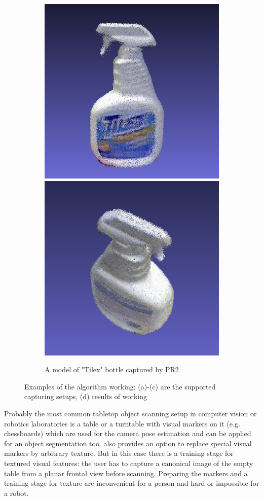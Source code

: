 \documentclass[letterpaper, 10 pt, conference]{ieeeconf}  %
\begin{document}
\begin{figure}[t]
        \begin{subfigure}[b]{\linewidth}
                \centering
                \includegraphics[width=0.49\linewidth]{../tizer/tilexFrontal.png}
                \includegraphics[width=0.49\linewidth]{../tizer/tilexTop.png}
                \caption{A model of "Tilex" bottle captured by PR2}
        \end{subfigure}
        \caption{Examples of the algorithm working: (a)-(c) are the supported 
        capturing setups, (d) results of working}
        \label{fig:tizer}
\end{figure}


Probably the most common tabletop object scanning setup in computer 
vision or robotics laboratories is a table or a turntable with
visual markers on it (e.g. chessboards) which
are used for the camera pose estimation and can be applied for 
an object segmentation too. \cite{ectoObjectRecognitionCapture} also 
provides an option to replace special visual markers by arbitrary texture. 
But in this case there is a training stage for textured visual features:
the user has to capture a canonical image of the empty table from
a planar frontal view before scanning. Preparing the markers
and a training stage for texture are inconvenient for a person and
hard or impossible for a robot. 
\end{document}
